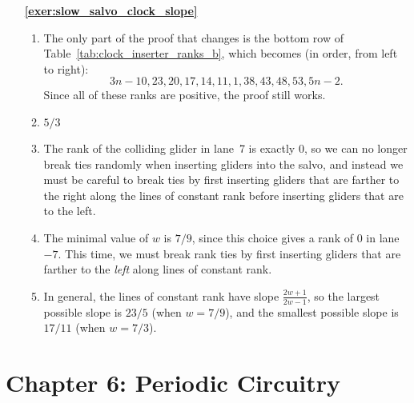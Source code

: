 \begin{multicols}{2}
\begin{itemize}[leftmargin=0em]
	
	\item[\bf\color{ocre}\sffamily\ref{exer:slow_salvo_clock_slope}]
	\begin{enumerate}[leftmargin=1.5em,label=\bf\color{ocre}(\alph*)]
		\item The only part of the proof that changes is the bottom row of Table~\ref{tab:clock_inserter_ranks_b}, which becomes (in order, from left to right): $$3n-10, 23, 20, 17, 14, 11, 1, 38, 43, 48, 53, 5n-2.$$ Since all of these ranks are positive, the proof still works. \\
		
		\item $5/3$ \\
		
		\item The rank of the colliding glider in lane~7 is exactly $0$, so we can no longer break ties randomly when inserting gliders into the salvo, and instead we must be careful to break ties by first inserting gliders that are farther to the right along the lines of constant rank before inserting gliders that are to the left. \\
		
		\item The minimal value of $w$ is $7/9$, since this choice gives a rank of $0$ in lane $-7$. This time, we must break rank ties by first inserting gliders that are farther to the \emph{left} along lines of constant rank. \\
		
		\item In general, the lines of constant rank have slope $\frac{2w+1}{2w-1}$, so the largest possible slope is $23/5$ (when $w = 7/9$), and the smallest possible slope is $17/11$ (when $w = 7/3$). \\
	\end{enumerate}
\end{itemize}
\end{multicols}




\hypertarget{solutions_periodic_circuitry}{}\label{solutions_periodic_circuitry}
\section*{Chapter 6: Periodic Circuitry}
\renewcommand{\chapterfolder}{periodic_circuitry/}

